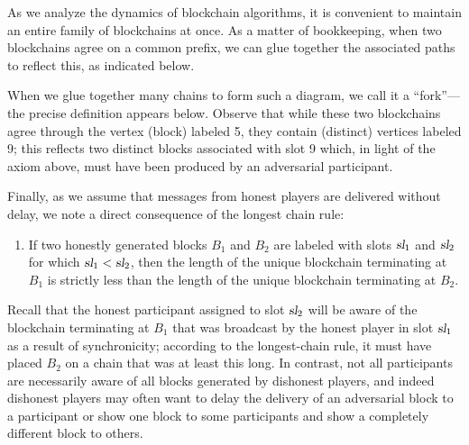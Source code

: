 As we analyze the dynamics of blockchain algorithms, it is convenient
to maintain an entire family of blockchains at once. As a matter of
bookkeeping, when two blockchains agree on a common prefix, we can
glue together the associated paths to reflect this, as indicated
below.
\begin{center}
  \end{center}
  When we glue together many chains to form such a diagram, we call it
  a ``fork''---the precise definition appears below. Observe that
  while these two blockchains agree through the vertex (block) labeled
  5, they contain (distinct) vertices labeled 9; this reflects two
  distinct blocks associated with slot 9 which, in light of the axiom
  above, must have been produced by an adversarial participant.
  
  Finally, as we assume that messages from honest players are
  delivered without delay, we note a direct consequence of the longest
  chain rule:
\begin{enumerate}[label={\textbf{A\arabic*}}., resume=axiom]
\item If two honestly generated blocks $B_1$ and $B_2$ are labeled
  with slots $\textsl{sl}_1$ and $\textsl{sl}_2$ for which $\textsl{sl}_1 < \textsl{sl}_2$,
  then the length of the unique blockchain terminating at $B_1$ is
  strictly less than the length of the unique blockchain terminating at $B_2$.
\end{enumerate}
Recall that the honest participant assigned to slot
$\textsl{sl}_2$ will be aware of the blockchain terminating at $B_1$ that
was broadcast by the honest player in slot $\textsl{sl}_1$ as a result of
synchronicity; according to the longest-chain rule, it must have
placed $B_2$ on a chain that was at least this long. In contrast, not
all participants are necessarily aware of all blocks generated by
dishonest players, and indeed dishonest players may often want to
delay the delivery of an adversarial block to a participant or show
one block to some participants and show a completely different block
to others.

